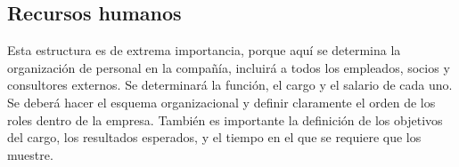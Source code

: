 \subsection{Recursos humanos}

Esta estructura es de extrema importancia, porque aquí se determina la organización de personal en la compañía, incluirá a todos los empleados, socios y consultores externos. Se determinará la función, el cargo y el salario de cada uno. Se deberá hacer el esquema organizacional y definir claramente el orden de los roles dentro de la empresa. También es importante la definición de los objetivos del cargo, los resultados esperados, y el tiempo en el que se requiere que los muestre.